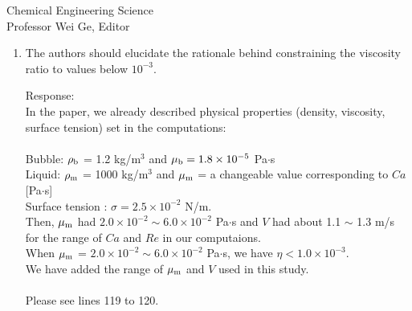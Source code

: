 \documentclass{letter}
\begin{document}
\begin{letter}{
Chemical Engineering Science\\
Professor Wei Ge, Editor\\}
\begin{enumerate}
\begin{enumerate}
\item [1.] M. Ohta, T. Furukawa, Y. Yoshida, M. Sussman,\\
A Three-Dimensional Numerical Study on the Dynamics and Deformation of a Bubble Rising in a Hybrid Carreau and FENE-CR Modeled Polymeric Liquid, 
Journal of Non-Newtonian Fluid Mechanics, Vol.265, pp.66-78 (2019).\\
\item [2.] M. Ohta, Y. Akama, Y. Yoshida, \\
M. Sussman, Influence of the Viscosity Ratio on Drop Dynamics and Breakup for a Drop Rising in an Immiscible Low-Viscous Liquid,\\
Journal of Fluid Mechanics, Vol.752, pp.383-409 (2014).\\
\item [3.]  M. Ohta, M. Sussman, \\
The Buoyancy-Driven Motion of a Single Skirted Bubble or Drop Rising through a Viscous Liquid, \\
Physics of Fluids, Vol.24, 112101 (18pp) (2012).\\
\end{enumerate}
Please see lines 223 to 227.
\\

\par\noindent
\item
\textsf
{The authors should elucidate the rationale behind constraining the viscosity ratio to values below $10^{-3}$.}
\vspace{3 mm}

Response: \\
In the paper, we already described physical properties (density, viscosity, surface tension) set in the computations:\\
\\
Bubble: $\rho_{\rm b}$ = 1.2 kg/m$^{3}$ and $\mu_{\rm b} = 1.8 \times 10^{-5} $ Pa$\cdot$s\\
Liquid:  $\rho_{\rm m}$ = 1000 kg/m$^{3}$ and $\mu_{\rm m}$ = a changeable value corresponding to $Ca$ [Pa$\cdot$s]\\
Surface tension : $\sigma =2.5 \times 10^{-2}$ N/m. \\
Then, $\mu_{\rm m}$ had $2.0 \times 10^{-2} \sim 6.0 \times 10^{-2}$ Pa$\cdot$s and
$V$ had about 1.1 $\sim$ 1.3 m/s for the range of $Ca$ and $Re$ in our computaions.\\
When $\mu_{\rm m}$ = $2.0 \times 10^{-2} \sim 6.0 \times 10^{-2}$ Pa$\cdot$s, we have $\eta < 1.0 \times 10^{-3}$.\\
We have added the range of $\mu_{\rm m}$ and $V$ used in this study.\\
\\
Please see lines 119 to 120.
\\


\end{enumerate}
\end{letter}
\end{document}
